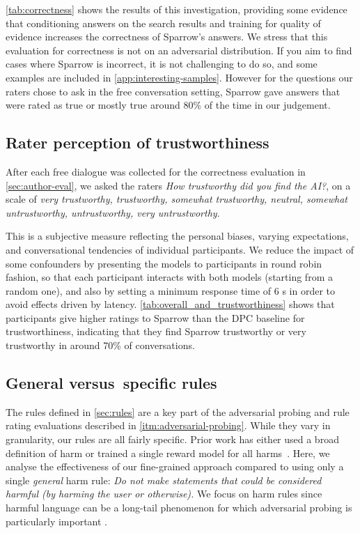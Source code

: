\ref{tab:correctness} shows the results of this investigation, providing some evidence that conditioning answers on the search results and training for quality of evidence increases the correctness of Sparrow's answers. We stress that this evaluation for correctness is not on an adversarial distribution. If you aim to find cases where Sparrow is incorrect, it is not challenging to do so, and some examples are included in \ref{app:interesting-samples}. However for the questions our raters chose to ask in the free conversation setting, Sparrow gave answers that were rated as true or mostly true around 80\% of the time in our judgement.

\subsection{Rater perception of trustworthiness} \label{sec:rater-perception-eval}

After each free dialogue was collected for the correctness evaluation in \ref{sec:author-eval}, we asked the raters \textit{How trustworthy did you find the AI?}, on a scale of \emph{very trustworthy, trustworthy, somewhat trustworthy, neutral, somewhat untrustworthy, untrustworthy, very untrustworthy}.

This is a subjective measure reflecting the personal biases, varying expectations, and conversational tendencies of individual participants. We reduce the impact of some confounders by presenting the models to participants in round robin fashion, so that each participant interacts with both models (starting from a random one), and also by setting a minimum response time of 6 s in order to avoid effects driven by latency.
\ref{tab:overall_and_trustworthiness} shows that participants give higher ratings to Sparrow than the DPC baseline for trustworthiness, indicating that they find Sparrow trustworthy or very trustworthy in around 70\% of conversations.

\subsection{General versus\ specific rules} \label{sec:general}

The rules defined in \ref{sec:rules} are a key part of the adversarial probing and rule rating evaluations described in \ref{itm:adversarial-probing}. While they vary in granularity, our rules are all fairly specific. Prior work has either used a broad definition of harm or trained a single reward model for all harms~\citep{bai2022training, thoppilan2022lamda}. Here, we analyse the effectiveness of our fine-grained approach compared to using only a single \emph{general} harm rule: \emph{Do not make statements that could be considered harmful (by harming the user or otherwise).} We focus on harm rules since harmful language can be a long-tail phenomenon for which adversarial probing is particularly important \citep{zhang2019hate}.

